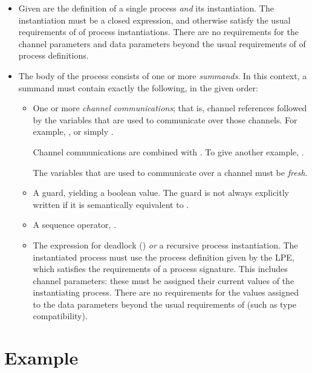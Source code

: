 \begin{itemize}

\item Given are the definition of a single process \emph{and} its instantiation.
The instantiation must be a closed expression, and otherwise satisfy the usual requirements of \txs{} of process instantiations.
There are no requirements for the channel parameters and data parameters beyond the usual requirements of \txs{} of process definitions.

\item The body of the process consists of one or more \emph{summands}.
In this context, a summand must contain exactly the following, in the given order:

\begin{itemize}

\item One or more \emph{channel communications}; that is, channel references followed by the variables that are used to communicate over those channels.
For example, , or simply .

Channel communications are combined with \inlinecode{|}.
To give another example, .

The variables that are used to communicate over a channel must be \emph{fresh}.

\item A guard, yielding a boolean value.
The guard is not always explicitly written if it is semantically equivalent to .

\item A sequence operator, \inlinecode{>->}.

\item The expression for deadlock () \emph{or} a recursive process instantiation.
The instantiated process must use the process definition given by the LPE, which satisfies the requirements of a \txs{} process signature.
This includes channel parameters: these must be assigned their current values of the instantiating process.
There are no requirements for the values assigned to the data parameters beyond the usual requirements of \txs{} (such as type compatibility).

\end{itemize}

\end{itemize}

\section{Example}

